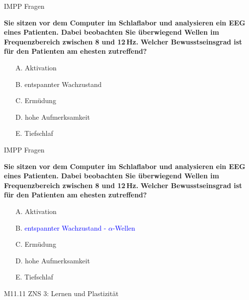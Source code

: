 \documentclass{beamer}
\begin{document}

\begin{frame}{IMPP Fragen}

\textbf{Sie sitzen vor dem Computer im Schlaflabor und analysieren ein EEG eines Patienten. Dabei beobachten Sie überwiegend Wellen im Frequenzbereich zwischen 8 und 12\,Hz. }
\textbf{Welcher Bewusstseinsgrad ist für den Patienten am ehesten zutreffend?} \\[0.2 cm]

\begin{itemize}
\item[A.] Aktivation
\item[B.] entspannter Wachzustand
\item[C.] Ermüdung
\item[D.] hohe Aufmerksamkeit
\item[E.] Tiefschlaf
\end{itemize}

\end{frame}


\begin{frame}{IMPP Fragen}

\textbf{Sie sitzen vor dem Computer im Schlaflabor und analysieren ein EEG eines Patienten. Dabei beobachten Sie überwiegend Wellen im Frequenzbereich zwischen 8 und 12\,Hz. }
\textbf{Welcher Bewusstseinsgrad ist für den Patienten am ehesten zutreffend?} \\[0.2 cm]

\begin{itemize}
\item[A.] Aktivation
\item[B.] \textcolor{blue}{entspannter Wachzustand  - \(\alpha\)-Wellen}  
\item[C.] Ermüdung
\item[D.] hohe Aufmerksamkeit
\item[E.] Tiefschlaf
\end{itemize}

\end{frame}






\begin{frame}{M11.11 ZNS 3: Lernen und Plastizität} 

\end{frame}
\end{document}
